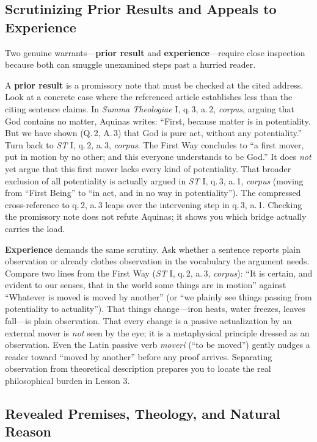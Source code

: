 \subsection{Scrutinizing Prior Results and Appeals to Experience}

Two genuine warrants---\textbf{prior result} and \textbf{experience}---require close inspection because both can smuggle unexamined steps past a hurried reader.

A \textbf{prior result} is a promissory note that must be checked at the cited address. Look at a concrete case where the referenced article establishes less than the citing sentence claims. In \emph{Summa Theologiae} I, q.\,3, a.\,2, \emph{corpus}, arguing that God contains no matter, Aquinas writes: ``First, because matter is in potentiality. But we have shown (Q.\,2, A.\,3) that God is pure act, without any potentiality.'' Turn back to \emph{ST} I, q.\,2, a.\,3, \emph{corpus}. The First Way concludes to ``a first mover, put in motion by no other; and this everyone understands to be God.'' It does \emph{not} yet argue that this first mover lacks every kind of potentiality. That broader exclusion of all potentiality is actually argued in \emph{ST} I, q.\,3, a.\,1, \emph{corpus} (moving from ``First Being'' to ``in act, and in no way in potentiality''). The compressed cross-reference to q.\,2, a.\,3 leaps over the intervening step in q.\,3, a.\,1. Checking the promissory note does not refute Aquinas; it shows you which bridge actually carries the load.

\textbf{Experience} demands the same scrutiny. Ask whether a sentence reports plain observation or already clothes observation in the vocabulary the argument needs. Compare two lines from the First Way (\emph{ST} I, q.\,2, a.\,3, \emph{corpus}): ``It is certain, and evident to our senses, that in the world some things are in motion'' against ``Whatever is moved is moved by another'' (or ``we plainly see things passing from potentiality to actuality''). That things change---iron heats, water freezes, leaves fall---is plain observation. That every change is a passive actualization by an external mover is \emph{not} seen by the eye; it is a metaphysical principle dressed as an observation. Even the Latin passive verb \emph{moveri} (``to be moved'') gently nudges a reader toward ``moved by another'' before any proof arrives. Separating observation from theoretical description prepares you to locate the real philosophical burden in Lesson 3.

\subsection{Revealed Premises, Theology, and Natural Reason}


